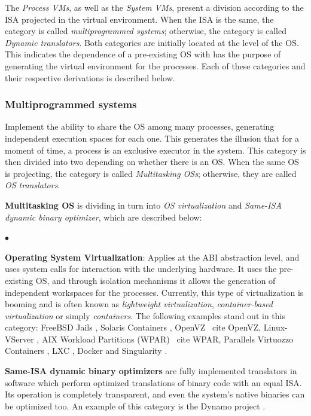 	The \textit{Process VMs}, as well as the \textit{System VMs}, present a division according to the ISA projected in the virtual environment. When the ISA is the same, the category is called \textit{multiprogrammed systems}; otherwise, the category is called \textit{Dynamic translators}. Both categories are initially located at the level of the OS. This indicates the dependence of a pre-existing OS with has the purpose of generating the virtual environment for the processes. Each of these categories and their respective derivations is described below.
	
	\subsubsection{Multiprogrammed systems}
	
	Implement the ability to share the OS among many processes, generating independent execution spaces for each one. This generates the illusion that for a moment of time, a process is an exclusive executor in the system. This category is then divided into two depending on whether there is an OS. When the same OS is projecting, the category is called \textit{Multitasking OSs}; otherwise, they are called \textit{OS translators}.
	
	\textbf {Multitasking OS} is dividing in turn into \textit{OS virtualization} and \textit{Same-ISA dynamic binary optimizer}, which are described below:
		
	\begin{list}{$\bullet$}{\setlength{\leftmargin}{5pt}}
	
		\item \textbf{Operating System Virtualization}: Applies at the ABI abstraction level, and uses system calls for interaction with the underlying hardware. It uses the pre-existing OS, and through isolation mechanisms it allows the generation of independent workspaces for the processes. Currently, this type of virtualization is booming and is often known as \textit {lightweight virtualization}, \textit{container-based virtualization} or simply \textit{containers}. The following examples stand out in this category: FreeBSD Jails \cite {Biederman2006}, Solaris Containers \cite {SolarisZones}, OpenVZ \ cite {OpenVZ}, Linux-VServer \cite {Linux-VServer}, AIX Workload Partitions (WPAR) \ cite {WPAR}, Parallels Virtuozzo Containers \cite {Virtuozzo}, LXC \cite {LXC}, Docker \cite {Docker} and Singularity \cite {Sylabs.io}.
			
		\item \textbf{Same-ISA dynamic binary optimizers} are fully implemented translators in software which perform optimized translations of binary code with an equal ISA. Its operation is completely transparent, and even the system's native binaries can be optimized too. An example of this category is the Dynamo project \cite{Bala2011}.
	\end{list}
		
